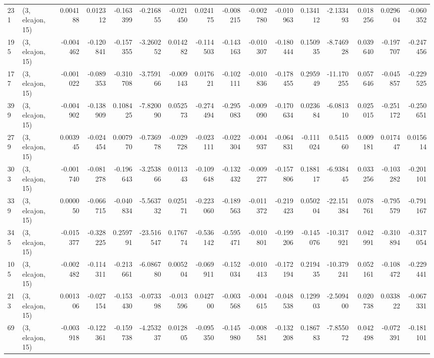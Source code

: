 \begin{tabular}{llrrrrrrrrrrrrrr}
231 &  (3, elcajon, 15) &   0.004188 &  0.012312 & -0.163399 &  -0.216855 & -0.021450 &   0.024175 & -0.008215 & -0.002780 & -0.010963 &  0.134112 &    -2.133493 &   0.018256 &   0.029604 &  -0.060352 \\
195 &  (3, elcajon, 15) &  -0.004462 & -0.120841 & -0.157355 &  -3.260252 &  0.014282 &  -0.114503 & -0.143163 & -0.010307 & -0.180444 &  0.150935 &    -8.746928 &   0.039640 &  -0.197707 &  -0.247456 \\
177 &  (3, elcajon, 15) &  -0.001022 & -0.089353 & -0.310708 &  -3.759166 & -0.009143 &   0.017621 & -0.102111 & -0.010836 & -0.178455 &  0.295949 &   -11.170255 &   0.057646 &  -0.045857 &  -0.229525 \\
399 &  (3, elcajon, 15) &  -0.004902 & -0.138909 &  0.108425 &  -7.820090 &  0.052573 &  -0.274494 & -0.295083 & -0.009090 & -0.170634 &  0.023684 &    -6.081310 &   0.025015 &  -0.251172 &  -0.250651 \\
279 &  (3, elcajon, 15) &   0.003945 & -0.024454 &  0.007970 &  -0.736978 & -0.029728 &  -0.023111 & -0.022304 & -0.004937 & -0.064831 & -0.111024 &     0.541560 &   0.009181 &   0.017447 &   0.015614 \\
303 &  (3, elcajon, 15) &  -0.001740 & -0.081278 & -0.196643 &  -3.253866 &  0.011343 &  -0.109648 & -0.132432 & -0.009277 & -0.157806 &  0.188117 &    -6.938445 &   0.033256 &  -0.103282 &  -0.201101 \\
339 &  (3, elcajon, 15) &   0.000050 & -0.066715 & -0.040834 &  -5.563732 &  0.025171 &  -0.223060 & -0.189563 & -0.011372 & -0.219423 &  0.050204 &   -22.151384 &   0.078761 &  -0.795579 &  -0.791167 \\
345 &  (3, elcajon, 15) &  -0.015377 & -0.328225 &  0.259791 & -23.516547 &  0.176774 &  -0.536142 & -0.595471 & -0.010801 & -0.199206 & -0.145076 &   -10.317921 &   0.042991 &  -0.310894 &  -0.317054 \\
105 &  (3, elcajon, 15) &  -0.002482 & -0.114311 & -0.213661 &  -6.086780 &  0.005204 &  -0.069911 & -0.152034 & -0.010413 & -0.172194 &  0.219435 &   -10.379241 &   0.052161 &  -0.108472 &  -0.229441 \\
213 &  (3, elcajon, 15) &   0.001306 & -0.027154 & -0.153430 &  -0.073398 & -0.013596 &   0.042700 & -0.003568 & -0.004615 & -0.048538 &  0.129903 &    -2.509400 &   0.020738 &   0.033822 &  -0.067331 \\
69  &  (3, elcajon, 15) &  -0.003918 & -0.122361 & -0.159738 &  -4.253237 &  0.012805 &  -0.095350 & -0.145980 & -0.008581 & -0.132208 &  0.186783 &    -7.855072 &   0.042498 &  -0.072391 &  -0.181101 \\

\end{tabular}
